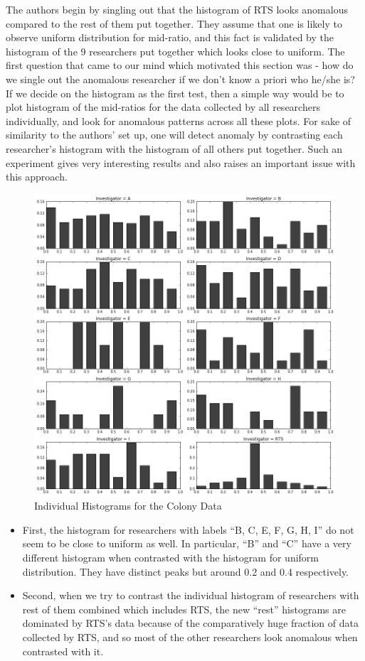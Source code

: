 \documentclass{article}
\begin{document}
    The authors begin by singling out that the histogram of RTS looks anomalous
compared to the rest of them put together. They assume that one is
likely to observe uniform distribution for mid-ratio, and this fact is
validated by the histogram of the 9 researchers put together which looks
close to uniform. The first question that came to our mind which motivated this section was - how do we single out the
anomalous researcher if we don't know a priori who he/she is? If we decide on the histogram as the first test, then a simple
way would be to plot histogram of the mid-ratios for the data
collected by all researchers individually, and look for anomalous patterns
across all these plots. For sake of similarity to the authors' set up,
one will detect anomaly by contrasting each researcher's histogram with
the histogram of all others put together. Such an experiment gives very
interesting results and also raises an important issue with this
approach.
\begin{figure}[H]
\centering
\includegraphics[width=0.8\linewidth]{images/new_mid_ratio.png}
\caption{Individual Histograms for the Colony Data}
\end{figure}

\begin{itemize}
\item
  First, the histogram for researchers with labels ``B, C, E, F, G, H, I'' do not
  seem to be close to uniform as well. In particular, ``B'' and ``C''
  have a very different histogram when contrasted with the histogram for
  uniform distribution. They have distinct peaks but around 0.2 and 0.4
  respectively.
\item
  Second, when we try to contrast the individual histogram of researchers
  with rest of them combined which includes RTS, the new ``rest''
  histograms are dominated by RTS's data because of the comparatively
  huge fraction of data collected by RTS, and so most of the other
  researchers look anomalous when contrasted with it.
\end{itemize}
\end{document}
